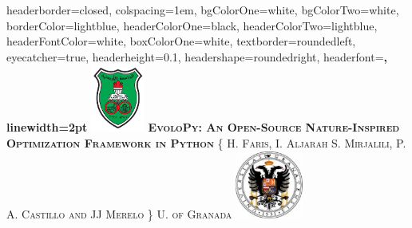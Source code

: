 \documentclass[landscape,a0paper,fontscale=0.22]{baposter} %
\begin{document}
\begin{poster}
{
headerborder=closed, %
colspacing=1em, %
bgColorOne=white, %
bgColorTwo=white, %
borderColor=lightblue, %
headerColorOne=black, %
headerColorTwo=lightblue, %
headerFontColor=white, %
boxColorOne=white, %
textborder=roundedleft, %
eyecatcher=true, %
headerheight=0.1\textheight, %
headershape=roundedright, %
headerfont=\Large\bf\textsc, %
linewidth=2pt %
}
%
{\includegraphics[height=6em]{julogo}} %
{\bf\textsc{EvoloPy: An Open-Source Nature-Inspired Optimization Framework in Python}\vspace{0.5em}} %
{\textsc{\{ H. Faris, I. Aljarah S. Mirjalili, P. A. Castillo and JJ Merelo \} \hspace{12pt}  U. of Granada}} %
{\includegraphics[height=6em]{granadalogo}} %


\end{poster}
\end{document}
